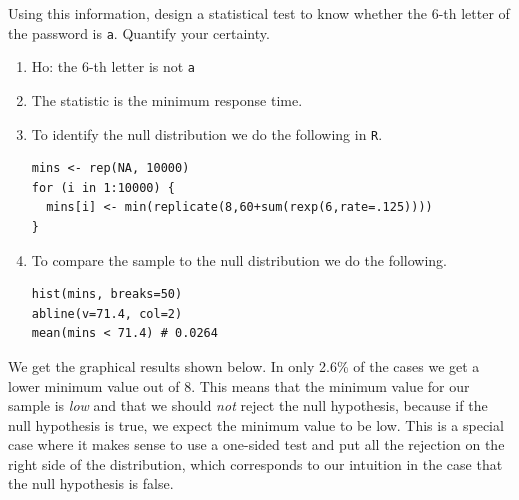 \documentclass[12pt]{article}
\begin{document}
  \begin{Exercise}[label={exo9}]
  Using this information, design a statistical test to
  know whether the 6-th letter of the password is \texttt{a}.
  Quantify your certainty.
\end{Exercise}
\begin{Answer}[ref={exo9}]
  \begin{enumerate}
    \item Ho: the 6-th letter is not \texttt{a}
    \item The statistic is the minimum response time.
    \item To identify the null distribution we do the following
      in \texttt{R}.

\begin{verbatim}
mins <- rep(NA, 10000)
for (i in 1:10000) {
  mins[i] <- min(replicate(8,60+sum(rexp(6,rate=.125))))
}
\end{verbatim}

    \item To compare the sample to the null distribution we do the
      following.

\begin{verbatim}
hist(mins, breaks=50)
abline(v=71.4, col=2)
mean(mins < 71.4) # 0.0264
\end{verbatim}

  \end{enumerate}

  We get the graphical results shown below. In only 2.6\% of
  the cases we get a lower minimum value out of 8. This means
  that the minimum value for our sample is \textit{low} and that
  we should \textit{not} reject the null hypothesis, because
  if the null hypothesis is true, we expect the minimum value
  to be low. This is a special case where it makes sense to
  use a one-sided test and put all the rejection on the right
  side of the distribution, which corresponds to our intuition
  in the case that the null hypothesis is false.


\end{Answer}
\end{document}
